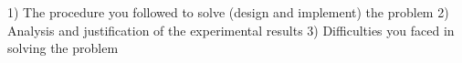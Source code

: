 1) The procedure you followed to solve (design and implement) the problem 
2) Analysis and justification of the experimental results 
3) Difficulties you faced in solving the problem 
